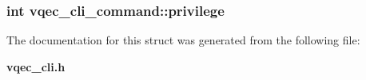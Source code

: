\subsubsection{\setlength{\rightskip}{0pt plus 5cm}int \bf{vqec\_\-cli\_\-command::privilege}}\label{structvqec__cli__command_02175cb755b96a2449b35ee88e41e85f}




The documentation for this struct was generated from the following file:\begin{CompactItemize}
\item 
\bf{vqec\_\-cli.h}\end{CompactItemize}
